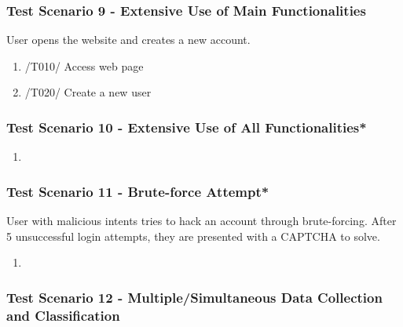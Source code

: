 \subsubsection{Test Scenario 9 - Extensive Use of Main Functionalities}
User opens the website and creates a new account. 
\begin{enumerate}
    \item /T010/ Access web page
    \item /T020/ Create a new user
\end{enumerate}
\subsubsection{Test Scenario 10 - Extensive Use of All Functionalities*}

\begin{enumerate}
    \item 
\end{enumerate}
\subsubsection{Test Scenario 11 - Brute-force Attempt*}
User with malicious intents tries to hack an account through brute-forcing. After 5 unsuccessful login attempts, they are presented with a CAPTCHA to solve.
\begin{enumerate}
    \item 
\end{enumerate}
\subsubsection{Test Scenario 12 - Multiple/Simultaneous Data Collection and Classification}
